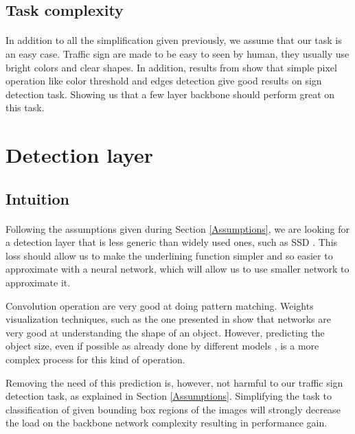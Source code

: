 \subsection{Task complexity}
\paragraph{}
In addition to all the simplification given previously, we assume that our task is an easy case. Traffic sign are made to be easy to seen by human, they usually use bright colors and clear shapes. In addition, results from \cite{de1997road, janssen1993hybrid, besserer1993shape} show that simple pixel operation like color threshold and edges detection give good results on sign detection task. Showing us that a few layer backbone should perform great on this task.


\section{Detection layer}
\subsection{Intuition}
\paragraph{}
Following the assumptions given during Section \ref{Assumptions}, we are looking for a detection layer that is less generic than widely used ones, such as SSD \cite{liu2016ssd}. This loss should allow us to make the underlining function simpler and so easier to approximate with a neural network, which will allow us to use smaller network to approximate it.

Convolution operation are very good at doing pattern matching. Weights visualization techniques, such as the one presented in \cite{yosinski2015understanding} show that networks are very good at understanding the shape of an object. However, predicting the object size, even if possible as already done by different models \cite{yolov3, liu2016ssd, ren2015faster}, is a more complex process for this kind of operation.

Removing the need of this prediction is, however, not harmful to our traffic sign detection task, as explained in Section \ref{Assumptions}. Simplifying the task to classification of given bounding box regions of the images will strongly decrease the load on the backbone network complexity resulting in performance gain.

